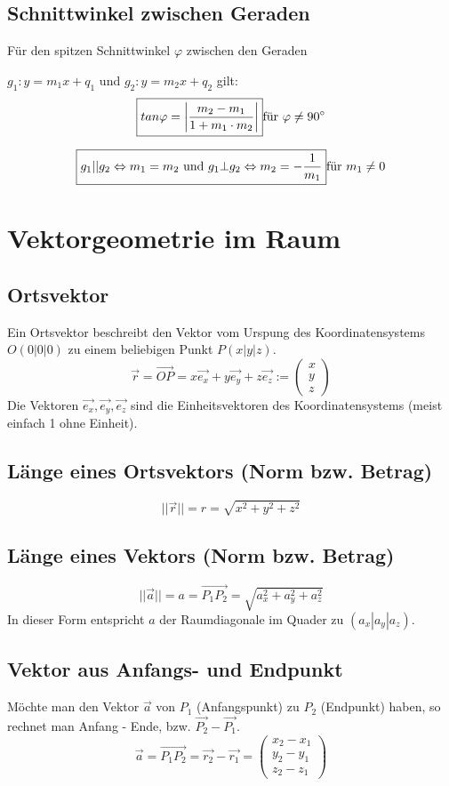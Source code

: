 \subsection{Schnittwinkel zwischen Geraden}
Für den spitzen Schnittwinkel $\varphi$ zwischen den Geraden 

$g_1: y = m_1x + q_1$ und $g_2: y = m_2x + q_2$ gilt:
\[ \boxed{ tan\varphi = \left| \frac{m_2 - m_1}{1 + m_1 \cdot m_2} \right| } \\ 
\text{für } \varphi \neq 90^{\circ} \]

\[ \boxed{ g_1 || g_2 \Leftrightarrow m_1 = m_2 \text{ und } g_1 \bot g_2 
\Leftrightarrow m_2 = - \frac{1}{m_1} } \\ \text{für } m_1 \neq 0 \]

\section{Vektorgeometrie im Raum}

\subsection{Ortsvektor}
Ein Ortsvektor beschreibt den Vektor vom Urspung des Koordinatensystems 
$O(0|0|0)$ zu einem beliebigen Punkt $P(x|y|z)$.
\[	\boxed{ \vec{r} = \overrightarrow{OP} 
= x\vec{e_x} + y\vec{e_y} + z\vec{e_z} :=
	\left( 
	  \begin{array}{ccc} 
	    x \\ y \\ z
	  \end{array}
	\right) }
\]
\noindent
Die Vektoren $\vec{e_x},\vec{e_y},\vec{e_z}$ sind die Einheitsvektoren des 
Koordinatensystems (meist einfach 1 ohne Einheit).
\subsection{Länge eines Ortsvektors (Norm bzw. Betrag)}
\[ \boxed{ ||\vec{r}|| = r = \sqrt{x^2 + y^2 + z^2} } \]

\subsection{Länge eines Vektors (Norm bzw. Betrag)}
\[ \boxed{ ||\vec{a}|| = a = \overrightarrow{P_1P_2} 
= \sqrt{a_x^2 + a_y^2 + a_z^2} } \]
In dieser Form entspricht $a$ der Raumdiagonale im Quader zu $(a_x|a_y|a_z)$.

\subsection{Vektor aus Anfangs- und Endpunkt}
Möchte man den Vektor $\vec{a}$ von $P_1$ (Anfangspunkt) zu $P_2$ (Endpunkt) 
haben, so rechnet man Anfang - Ende, bzw. $\vec{P_2} - \vec{P_1}$.
\[  \boxed{
    \vec{a} = \overrightarrow{P_1P_2} = \vec{r_2} - \vec{r_1} =
    \left( 
	  \begin{array}{ccc} 
	    x_2 - x_1 \\ y_2 - y_1 \\ z_2 - z_1
	  \end{array}
	\right)
    }
\]

